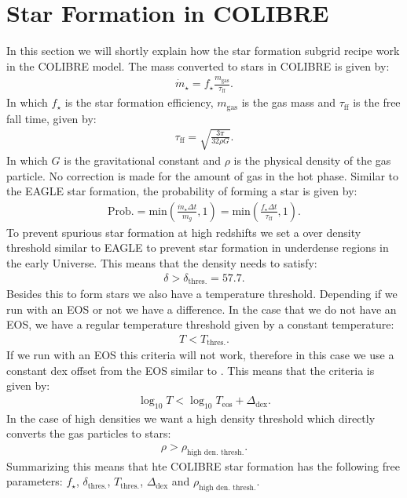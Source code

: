 \section{Star Formation in COLIBRE}

In this section we will shortly explain how the star formation subgrid 
recipe work in the COLIBRE model. The mass converted to stars in COLIBRE
is given by:
\begin{align}
 \dot{m}_\star = f_\star \frac{m_\text{gas}}{\tau_\text{ff}}.
\end{align}
In which $f_\star$ is the star formation efficiency, $m_\text{gas}$ is 
the gas mass and $\tau_\text{ff}$ is the free fall time, given by:
\begin{align}
 \tau_\text{ff} = \sqrt{\frac{3 \pi}{32\rho G}}.
\end{align}
In which $G$ is the gravitational constant and $\rho$ is the physical 
density of the gas particle. No correction is made for the amount of gas 
in the hot phase. Similar to the EAGLE star formation, the probability of 
forming a star is given by:
\begin{align}
 \text{Prob.} = \text{min} \left( \frac{\dot{m}_\star \Delta t}{m_g}, 1 \right) 
 = \text{min} \left( \frac{f_\star \Delta t}{\tau_\text{ff}}, 1 \right).
\end{align}
To prevent spurious star formation at high redshifts we set a over density
threshold similar to EAGLE to prevent star formation in underdense regions 
in the early Universe. This means that the density needs to satisfy:
\begin{align}
 \delta > \delta_\text{thres.} = 57.7.
\end{align}
Besides this to form stars we also have a temperature threshold. Depending if 
we run with an EOS or not we have a difference. In the case that we do not 
have an EOS, we have a regular temperature threshold given by a constant 
temperature:
\begin{align}
 T < T_\text{thres.}.
\end{align}
If we run with an EOS this criteria will not work, therefore in this case 
we use a constant dex offset from the EOS similar to \citet{dallavecchia2012}.
This means that the criteria is given by:
\begin{align}
 \log_{10} T < \log_{10} T_\text{eos} + \Delta_\text{dex}.
\end{align}
In the case of high densities we want a high density threshold which directly
converts the gas particles to stars:
\begin{align}
 \rho > \rho_\text{high den. thresh.}.
\end{align}
Summarizing this means that hte COLIBRE star formation has the following free
parameters: $f_\star$, $\delta_\text{thres.}$, $T_\text{thres.}$, 
$\Delta_\text{dex}$ and $\rho_\text{high den. thresh.}$.
